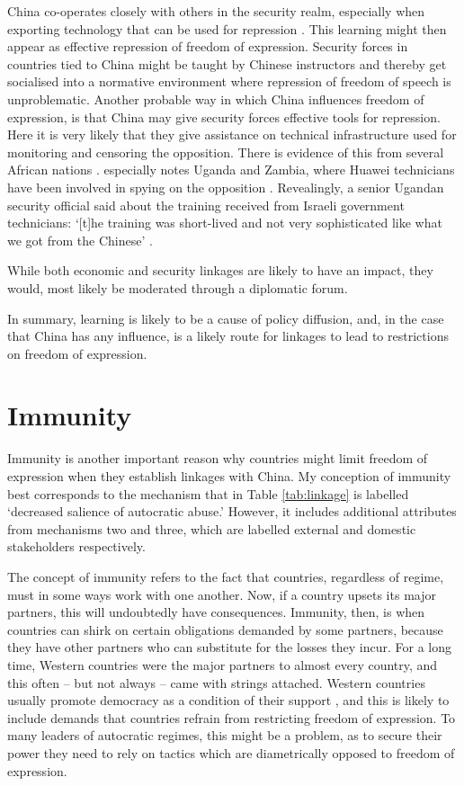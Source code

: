  China co-operates closely with others in the security realm, especially when exporting technology that can be used for repression \citep{hoffman_chinas_2022}. This learning might then appear as effective repression of freedom of expression. Security forces in countries tied to China might be taught by Chinese instructors and thereby get socialised into a normative environment where repression of freedom of speech is unproblematic. Another probable way in which China influences freedom of expression, is that China may give security forces effective tools for repression. Here it is very likely that they give assistance on technical infrastructure used for monitoring and censoring the opposition. There is evidence of this from several African nations \citep{hoffman_chinas_2022, parkinson_huawei_2019}.  \citet{parkinson_huawei_2019} especially notes Uganda and Zambia, where Huawei technicians have been involved in spying on the opposition \citep{parkinson_huawei_2019}. Revealingly, a senior Ugandan security official said about the training received from Israeli government technicians: `[t]he training was short-lived and not very sophisticated like what we got from the Chinese' \citep{parkinson_huawei_2019}. 

While both economic and security linkages are likely to have an impact, they would, most likely be moderated through a diplomatic forum.

In summary, learning is likely to be a cause of policy diffusion, and, in the case that China has any influence, is a likely route for linkages to lead to restrictions on freedom of expression.

\section{Immunity}
Immunity is another important reason why countries might limit freedom of expression when they establish linkages with China. My conception of immunity best corresponds to the mechanism that in Table \ref{tab:linkage} is labelled `decreased salience of autocratic abuse.' However, it includes additional attributes from mechanisms two and three, which are labelled external and domestic stakeholders respectively. 

The concept of immunity refers to the fact that countries, regardless of regime, must in some ways work with one another. Now, if a country upsets its major partners, this will undoubtedly have consequences. Immunity, then, is when countries can shirk on certain obligations demanded by some partners, because they have other partners who can substitute for the losses they incur. For a long time, Western countries were the major partners to almost every country, and this often -- but not always \citep{borzel_noble_2015, wong_chinese_2019} -- came with strings attached. Western countries usually promote democracy as a condition of their support \citep{levitsky_linkage_2006}, and this is likely to include demands that countries refrain from restricting freedom of expression. To many leaders of autocratic regimes, this might be a problem, as to secure their power they need to rely on tactics which are diametrically opposed to freedom of expression.

